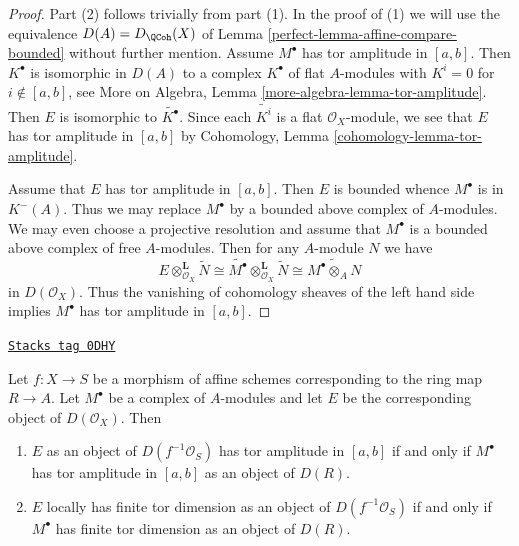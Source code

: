 \begin{proof}

Part (2) follows trivially from part (1). In the proof of (1) we will
use the equivalence $D(A) = D_\QCoh(X)$ of
Lemma \ref{perfect-lemma-affine-compare-bounded}
without further mention.
Assume $M^\bullet$ has tor amplitude in $[a, b]$. Then $K^\bullet$
is isomorphic in $D(A)$ to a complex $K^\bullet$ of flat $A$-modules
with $K^i = 0$ for $i \not \in [a, b]$, see
More on Algebra, Lemma \ref{more-algebra-lemma-tor-amplitude}.
Then $E$ is isomorphic to $\widetilde{K^\bullet}$. Since each
$\widetilde{K^i}$ is a flat $\mathcal{O}_X$-module, we see
that $E$ has tor amplitude in $[a, b]$ by
Cohomology, Lemma \ref{cohomology-lemma-tor-amplitude}.

\medskip\noindent
Assume that $E$ has tor amplitude in $[a, b]$. Then $E$ is bounded
whence $M^\bullet$ is in $K^-(A)$. Thus we may replace $M^\bullet$
by a bounded above complex of $A$-modules. We may even choose
a projective resolution and assume that $M^\bullet$ is a bounded above
complex of free $A$-modules. Then for any $A$-module $N$ we have
$$
E \otimes_{\mathcal{O}_X}^\mathbf{L} \widetilde{N}
\cong
\widetilde{M^\bullet} \otimes_{\mathcal{O}_X}^\mathbf{L} \widetilde{N}
\cong
\widetilde{M^\bullet \otimes_A N}
$$
in $D(\mathcal{O}_X)$. Thus the vanishing of cohomology sheaves of
the left hand side implies $M^\bullet$ has tor amplitude in $[a, b]$.
\end{proof}

\begin{lemma}
\label{perfect-lemma-tor-dimension-rel-affine}
\href{https://stacks.math.columbia.edu/tag/0DHY}{\texttt{Stacks tag 0DHY}}

Let $f : X \to S$ be a morphism of affine schemes corresponding
to the ring map $R \to A$. Let $M^\bullet$ be a
complex of $A$-modules and let $E$ be the corresponding object
of $D(\mathcal{O}_X)$. Then
\begin{enumerate}
\item $E$ as an object of $D(f^{-1}\mathcal{O}_S)$ has tor amplitude in
$[a, b]$ if and only if $M^\bullet$ has tor amplitude in $[a, b]$
as an object of $D(R)$.
\item $E$ locally has finite tor dimension as an object of
$D(f^{-1}\mathcal{O}_S)$ if and only if $M^\bullet$
has finite tor dimension as an object of $D(R)$.
\end{enumerate}
\end{lemma}

